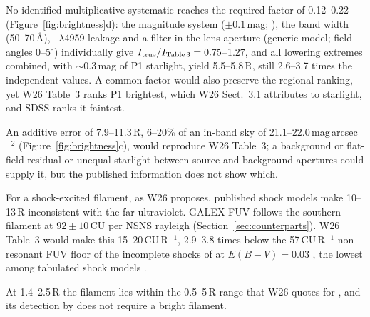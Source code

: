 No identified multiplicative systematic reaches the required factor of 0.12--0.22 (Figure~\ref{fig:brightness}d): the magnitude system ($\pm0.1$\,mag; \citealt{Blanton2007}), the band width (50--70\,\AA), \Oiii~$\lambda$4959 leakage and a filter in the lens aperture (generic model; field angles 0--5$^\circ$) individually give $I_{\rm true}/I_{\rm Table\,3}=0.75$--1.27, and all lowering extremes combined, with $\sim$0.3\,mag of P1 starlight, yield 5.5--5.8\,R, still 2.6--3.7 times the independent values. A common factor would also preserve the regional ranking, yet W26 Table~3 ranks P1 brightest, which W26 Sect.~3.1 attributes to starlight, and SDSS ranks it faintest.

An additive error of 7.9--11.3\,R, 6--20\% of an in-band sky of 21.1--22.0\,mag\,arcsec$^{-2}$ (Figure~\ref{fig:brightness}c), would reproduce W26 Table~3; a background or flat-field residual or unequal starlight between source and background apertures could supply it, but the published information does not show which.

For a shock-excited filament, as W26 proposes, published shock models make 10--13\,R inconsistent with the far ultraviolet. GALEX FUV follows the southern filament at $92\pm10$\,CU per NSNS rayleigh (Section~\ref{sec:counterparts}). W26 Table~3 would make this 15--20\,CU\,R$^{-1}$, 2.9--3.8 times below the 57\,CU\,R$^{-1}$ non-resonant FUV floor of the incomplete shocks of \citet{Raymond1988} at $E(B-V)=0.03$ \citep{Schlegel1998}, the lowest among tabulated shock models \citep{Raymond1979,Cox1985,Dopita1996}.

At 1.4--2.5\,R the filament lies within the 0.5--5\,R range that W26 quotes for \citet{Fesen2024}, and its detection by \citet{Fesen2026} does not require a bright filament.


